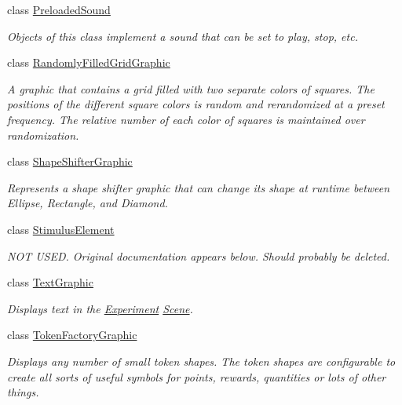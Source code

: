 \begin{DoxyCompactItemize}
class \hyperlink{class_picto_1_1_preloaded_sound}{Preloaded\-Sound}
\begin{DoxyCompactList}\small\item\em Objects of this class implement a sound that can be set to play, stop, etc. \end{DoxyCompactList}\item 
class \hyperlink{class_picto_1_1_randomly_filled_grid_graphic}{Randomly\-Filled\-Grid\-Graphic}
\begin{DoxyCompactList}\small\item\em A graphic that contains a grid filled with two separate colors of squares. The positions of the different square colors is random and rerandomized at a preset frequency. The relative number of each color of squares is maintained over randomization. \end{DoxyCompactList}\item 
class \hyperlink{class_picto_1_1_shape_shifter_graphic}{Shape\-Shifter\-Graphic}
\begin{DoxyCompactList}\small\item\em Represents a shape shifter graphic that can change its shape at runtime between Ellipse, Rectangle, and Diamond. \end{DoxyCompactList}\item 
class \hyperlink{class_picto_1_1_stimulus_element}{Stimulus\-Element}
\begin{DoxyCompactList}\small\item\em N\-O\-T U\-S\-E\-D. Original documentation appears below. Should probably be deleted. \end{DoxyCompactList}\item 
class \hyperlink{class_picto_1_1_text_graphic}{Text\-Graphic}
\begin{DoxyCompactList}\small\item\em Displays text in the \hyperlink{class_picto_1_1_experiment}{Experiment} \hyperlink{class_picto_1_1_scene}{Scene}. \end{DoxyCompactList}\item 
class \hyperlink{class_picto_1_1_token_factory_graphic}{Token\-Factory\-Graphic}
\begin{DoxyCompactList}\small\item\em Displays any number of small token shapes. The token shapes are configurable to create all sorts of useful symbols for points, rewards, quantities or lots of other things. \end{DoxyCompactList}\item 

\end{DoxyCompactItemize}
